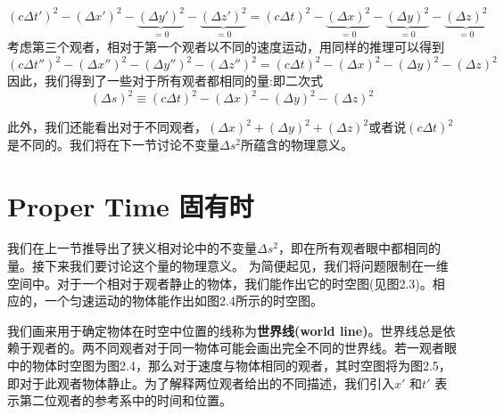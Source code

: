 \begin{equation}\label{eq2.11}
\left( c \Delta t' \right)^2
-\left(\Delta x' \right)^2
-\underbrace{\left(\Delta y' \right)^2}_{=0}
-\underbrace{\left(\Delta z' \right)^2}_{=0}
=
\left( c \Delta t \right)^2
-\underbrace{\left(\Delta x \right)^2}_{=0}
-\underbrace{\left(\Delta y \right)^2}_{=0}
-\underbrace{\left(\Delta z \right)^2}_{=0}
\end{equation}
考虑第三个观者，相对于第一个观者以不同的速度运动，用同样的推理可以得到
\begin{equation}\label{eq2.12}
\left( c \Delta t'' \right)^2
-\left(\Delta x'' \right)^2
-\left(\Delta y'' \right)^2
-\left(\Delta z'' \right)^2
=
\left( c \Delta t \right)^2
-\left(\Delta x \right)^2
-\left(\Delta y \right)^2
-\left(\Delta z \right)^2
\end{equation}
因此，我们得到了一些对于所有观者都相同的量:即二次式
\begin{equation}\label{eq2.13}
(\Delta s)^2
\equiv\left( c \Delta t \right)^2
-\left(\Delta x \right)^2
-\left(\Delta y \right)^2
-\left(\Delta z \right)^2
\end{equation}

此外，我们还能看出对于不同观者，$(\Delta x)^2+(\Delta y)^2+(\Delta z)^2$或者说$(c\Delta t)^2$是不同的。我们将在下一节讨论不变量$\Delta s^2$所蕴含的物理意义。


\section[固有时]{Proper Time 固有时}
\label{sec2.2}
我们在上一节推导出了狭义相对论中的不变量$\Delta s^2$，即在所有观者眼中都相同的量。接下来我们要讨论这个量的物理意义。
为简便起见，我们将问题限制在一维空间中。对于一个相对于观者静止的物体，我们能作出它的时空图(见图2.3)。相应的，一个匀速运动的物体能作出如图2.4所示的时空图。

我们画来用于确定物体在时空中位置的线称为{\bf{世界线(world line)}}。世界线总是依赖于观者的。两不同观者对于同一物体可能会画出完全不同的世界线。若一观者眼中的物体时空图为图2.4，那么对于速度与物体相同的观者，其时空图将为图2.5，即对于此观者物体静止。为了解释两位观者给出的不同描述，我们引入$x'$ 和$t'$ 表示第二位观者的参考系中的时间和位置。

